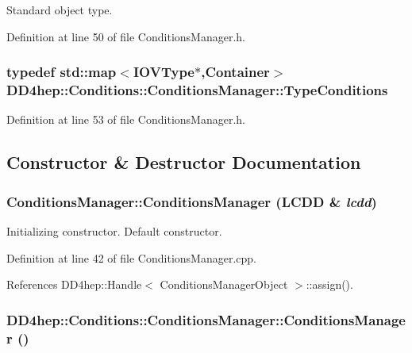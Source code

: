 Standard object type. 

Definition at line 50 of file ConditionsManager.h.\hypertarget{class_d_d4hep_1_1_conditions_1_1_conditions_manager_a8a7e3616b547ab4aadf035d8ef70f844}{
\subsubsection[{TypeConditions}]{\setlength{\rightskip}{0pt plus 5cm}typedef std::map$<${\bf IOVType}$\ast$,{\bf Container}$>$ {\bf DD4hep::Conditions::ConditionsManager::TypeConditions}}}
\label{class_d_d4hep_1_1_conditions_1_1_conditions_manager_a8a7e3616b547ab4aadf035d8ef70f844}


Definition at line 53 of file ConditionsManager.h.

\subsection{Constructor \& Destructor Documentation}
\hypertarget{class_d_d4hep_1_1_conditions_1_1_conditions_manager_afa92512839fc9d260fc8cfa1502a5836}{
\subsubsection[{ConditionsManager}]{\setlength{\rightskip}{0pt plus 5cm}ConditionsManager::ConditionsManager (LCDD \& {\em lcdd})}}
\label{class_d_d4hep_1_1_conditions_1_1_conditions_manager_afa92512839fc9d260fc8cfa1502a5836}


Initializing constructor. Default constructor. 

Definition at line 42 of file ConditionsManager.cpp.

References DD4hep::Handle$<$ ConditionsManagerObject $>$::assign().\hypertarget{class_d_d4hep_1_1_conditions_1_1_conditions_manager_a658c7e6a109d66c52310db6bc786582f}{
\subsubsection[{ConditionsManager}]{\setlength{\rightskip}{0pt plus 5cm}DD4hep::Conditions::ConditionsManager::ConditionsManager ()}}
\label{class_d_d4hep_1_1_conditions_1_1_conditions_manager_a658c7e6a109d66c52310db6bc786582f}


